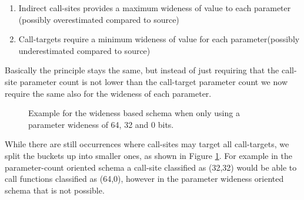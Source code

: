 \begin{enumerate}
\item Indirect call-sites provides a maximum wideness of value to each parameter (possibly overestimated compared to source)
\item Call-targets require a minimum wideness of value for each parameter(possibly underestimated compared to source)
\end{enumerate}

Basically the principle stays the same, but instead of just requiring that the call-site parameter count
is not lower than the call-target parameter count we now require the same also for the wideness of each
parameter.

\begin{figure}[h!]
\centering
{}
\caption{Example for the wideness based schema when only using a parameter wideness of 64, 32 and 0 bits.}
\label{fig:lattice3264}
\end{figure}

While there are still occurrences where call-sites may target all call-targets, we split the buckets up
into smaller ones, as shown in Figure \ref{fig:lattice3264}. For example in the parameter-count oriented
schema a call-site classified as (32,32) would be able to call functions classified as (64,0), however
in the parameter wideness oriented schema that is not possible.

